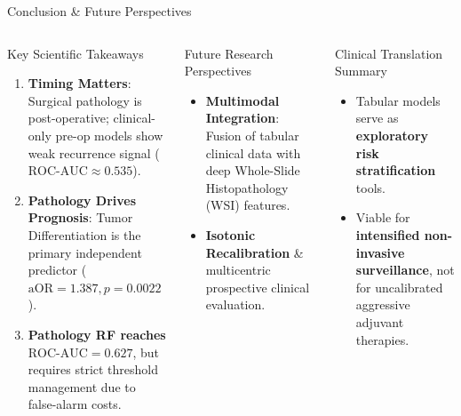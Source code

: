 \documentclass[10pt,aspectratio=169,xcolor={table,dvipsnames}]{beamer}
\newcommand{\ROC}{\text{ROC-AUC}}
\newcommand{\aOR}{\text{aOR}}
\begin{document}
\begin{frame}{Conclusion \& Future Perspectives}
  \begin{columns}[c]
      \begin{block}{Key Scientific Takeaways}
        \begin{enumerate}\setlength{\itemsep}{3pt}
          \item \textbf{Timing Matters}: Surgical pathology is post-operative; clinical-only pre-op models show weak recurrence signal ($\ROC \approx 0.535$).
          \item \textbf{Pathology Drives Prognosis}: Tumor Differentiation is the primary independent predictor ($\aOR = 1.387, p=0.0022$).
          \item \textbf{Pathology RF reaches $\ROC = 0.627$}, but requires strict threshold management due to false-alarm costs.
        \end{enumerate}
      \end{block}

      \begin{exampleblock}{Future Research Perspectives}
        \begin{itemize}\setlength{\itemsep}{2pt}
          \item \textbf{Multimodal Integration}: Fusion of tabular clinical data with deep Whole-Slide Histopathology (WSI) features.
          \item \textbf{Isotonic Recalibration} \& multicentric prospective clinical evaluation.
        \end{itemize}
      \end{exampleblock}

      \begin{alertblock}{Clinical Translation Summary}
        \begin{itemize}\setlength{\itemsep}{2pt}
          \item Tabular models serve as \textbf{exploratory risk stratification} tools.
          \item Viable for \textbf{intensified non-invasive surveillance}, not for uncalibrated aggressive adjuvant therapies.
        \end{itemize}
      \end{alertblock}
  \end{columns}
\end{frame}
\end{document}
